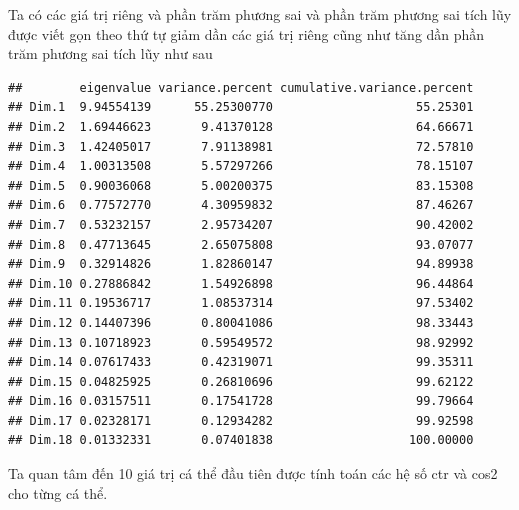 \documentclass[../thesis.tex]{subfiles}
\begin{document}
Ta có các giá trị riêng và phần trăm phương sai và phần trăm phương sai tích lũy được viết gọn theo thứ tự giảm dần các giá trị riêng cũng như tăng dần phần trăm phương sai tích lũy như sau
\begin{Shaded}
	\begin{Highlighting}[]
\SpecialCharTok{::}
	\end{Highlighting}
\end{Shaded}
\begin{verbatim}
##        eigenvalue variance.percent cumulative.variance.percent
## Dim.1  9.94554139      55.25300770                    55.25301
## Dim.2  1.69446623       9.41370128                    64.66671
## Dim.3  1.42405017       7.91138981                    72.57810
## Dim.4  1.00313508       5.57297266                    78.15107
## Dim.5  0.90036068       5.00200375                    83.15308
## Dim.6  0.77572770       4.30959832                    87.46267
## Dim.7  0.53232157       2.95734207                    90.42002
## Dim.8  0.47713645       2.65075808                    93.07077
## Dim.9  0.32914826       1.82860147                    94.89938
## Dim.10 0.27886842       1.54926898                    96.44864
## Dim.11 0.19536717       1.08537314                    97.53402
## Dim.12 0.14407396       0.80041086                    98.33443
## Dim.13 0.10718923       0.59549572                    98.92992
## Dim.14 0.07617433       0.42319071                    99.35311
## Dim.15 0.04825925       0.26810696                    99.62122
## Dim.16 0.03157511       0.17541728                    99.79664
## Dim.17 0.02328171       0.12934282                    99.92598
## Dim.18 0.01332331       0.07401838                   100.00000
\end{verbatim}

Ta quan tâm đến 10 giá trị cá thể đầu tiên được tính toán các hệ số ctr và cos2 cho từng cá thể.

\begin{Shaded}
	\begin{Highlighting}[]
	\end{Highlighting}
\end{Shaded}
\end{document}
